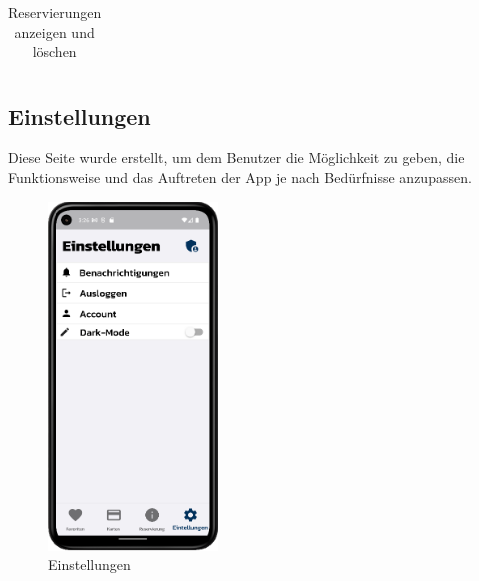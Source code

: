 \begin{table}[htbp]
\begin{tabular}{cc}
  \end{tabular}
  \caption{Reservierungen anzeigen und l\"oschen}
  \label{tab:example}
\end{table}


\newpage
\subsection{Einstellungen}

Diese Seite wurde erstellt, um dem Benutzer die Möglichkeit zu geben, die Funktionsweise und das Auftreten der App je nach Bedürfnisse anzupassen.
\begin{figure}[!h]
\centering
\includegraphics[width=0.4\textwidth]{FLUTTER/images/GP/Client_Einstellungen.png}
\caption{Einstellungen}
\end{figure}
\newpage
